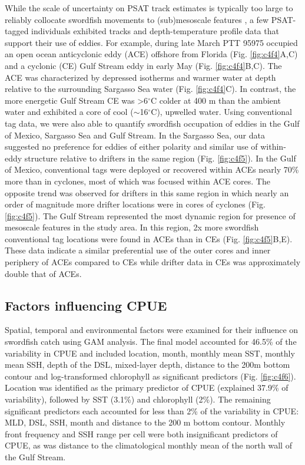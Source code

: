 While the scale of uncertainty on PSAT track estimates is typically too large to reliably collocate swordfish movements to (sub)mesoscale features \citep[$\sim$100 km,][]{Braun2018a}, a few PSAT-tagged individuals exhibited tracks and depth-temperature profile data that support their use of eddies. For example, during late March PTT 95975 occupied an open ocean anticyclonic eddy (ACE) offshore from Florida (Fig. \ref{fig:c4f4}A,C) and a cyclonic (CE) Gulf Stream eddy in early May (Fig. \ref{fig:c4f4}B,C). The ACE was characterized by depressed isotherms and warmer water at depth relative to the surrounding Sargasso Sea water (Fig. \ref{fig:c4f4}C). In contrast, the more energetic Gulf Stream CE was >6$^{\circ}$C colder at 400 m than the ambient water and exhibited a core of cool ($\sim$16$^{\circ}$C), upwelled water. Using conventional tag data, we were also able to quantify swordfish occupation of eddies in the Gulf of Mexico, Sargasso Sea and Gulf Stream. In the Sargasso Sea, our data suggested no preference for eddies of either polarity and similar use of within-eddy structure relative to drifters in the same region (Fig. \ref{fig:c4f5}). In the Gulf of Mexico, conventional tags were deployed or recovered within ACEs nearly 70\% more than in cyclones, most of which was focused within ACE cores. The opposite trend was observed for drifters in this same region in which nearly an order of magnitude more drifter locations were in cores of cyclones (Fig. \ref{fig:c4f5}). The Gulf Stream represented the most dynamic region for presence of mesoscale features in the study area. In this region, 2x more swordfish conventional tag locations were found in ACEs than in CEs (Fig. \ref{fig:c4f5}B,E). These data indicate a similar preferential use of the outer cores and inner periphery of ACEs compared to CEs while drifter data in CEs was approximately double that of ACEs.

\subsection{Factors influencing CPUE}

Spatial, temporal and environmental factors were examined for their influence on swordfish catch using GAM analysis. The final model accounted for 46.5\% of the variability in CPUE and included location, month, monthly mean SST, monthly mean SSH, depth of the DSL, mixed-layer depth, distance to the 200m bottom contour and log-transformed chlorophyll as significant predictors (Fig. \ref{fig:c4f6}). Location was identified as the primary predictor of CPUE (explained 37.9\% of variability), followed by SST (3.1\%) and chlorophyll (2\%). The remaining significant predictors each accounted for less than 2\% of the variability in CPUE: MLD, DSL, SSH, month and distance to the 200 m bottom contour. Monthly front frequency and SSH range per cell were both insignificant predictors of CPUE, as was distance to the climatological monthly mean of the north wall of the Gulf Stream.


